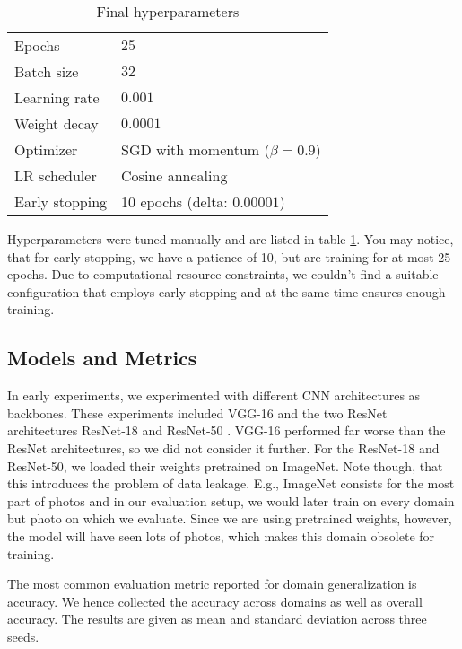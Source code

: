 \begin{table}
    \centering
    \caption{Final hyperparameters}
    \begin{tabular}{l l}
        \toprule
        Epochs & $25$ \\
        Batch size & $32$ \\
        Learning rate & $0.001$ \\
        Weight decay & $0.0001$ \\
        Optimizer & SGD with momentum ($\beta = 0.9$) \\
        LR scheduler & Cosine annealing \\
        Early stopping & 10 epochs (delta: $0.00001$) \\
        \bottomrule
    \end{tabular}
    \label{tab:hyperparameters}
\end{table}

Hyperparameters were tuned manually and are listed in table \ref{tab:hyperparameters}. You may notice, that for early stopping, we have a patience of 10, but are training for at most 25 epochs. Due to computational resource constraints, we couldn't find a suitable configuration that employs early stopping and at the same time ensures enough training.

\subsection{Models and Metrics}

In early experiments, we experimented with different CNN architectures as backbones. These experiments included VGG-16 \citep{vgg-16_ref} and the two ResNet architectures ResNet-18 and ResNet-50 \citep{resnet_ref}. VGG-16 performed far worse than the ResNet architectures, so we did not consider it further. For the ResNet-18 and ResNet-50, we loaded their weights pretrained on ImageNet. Note though, that this introduces the problem of data leakage. E.g., ImageNet consists for the most part of photos and in our evaluation setup, we would later train on every domain but photo on which we evaluate. Since we are using pretrained weights, however, the model will have seen lots of photos, which makes this domain obsolete for training.

The most common evaluation metric reported for domain generalization is accuracy. We hence collected the accuracy across domains as well as overall accuracy. The results are given as mean and standard deviation across three seeds.